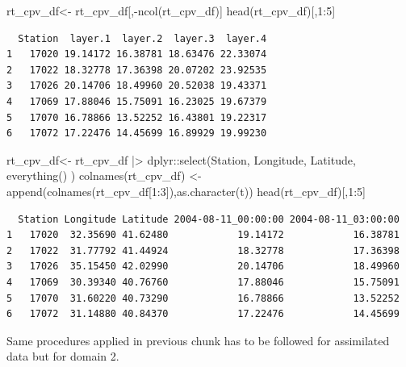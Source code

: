 \documentclass[
  letterpaper,
  DIV=11,
  numbers=noendperiod,
  abstract]{scrartcl}
\newenvironment{Shaded}{\begin{snugshade}}{\end{snugshade}}
\newcommand{\DecValTok}[1]{\textcolor[rgb]{0.68,0.00,0.00}{#1}}
\newcommand{\FunctionTok}[1]{\textcolor[rgb]{0.28,0.35,0.67}{#1}}
\newcommand{\NormalTok}[1]{\textcolor[rgb]{0.00,0.23,0.31}{#1}}
\newcommand{\OtherTok}[1]{\textcolor[rgb]{0.00,0.23,0.31}{#1}}
\newcommand{\SpecialCharTok}[1]{\textcolor[rgb]{0.37,0.37,0.37}{#1}}
\begin{document}
\begin{Shaded}
\begin{Highlighting}[]
\NormalTok{rt\_cpv\_df}\OtherTok{\textless{}{-}}\NormalTok{ rt\_cpv\_df[,}\SpecialCharTok{{-}}\FunctionTok{ncol}\NormalTok{(rt\_cpv\_df)]}
\FunctionTok{head}\NormalTok{(rt\_cpv\_df)[,}\DecValTok{1}\SpecialCharTok{:}\DecValTok{5}\NormalTok{]}
\end{Highlighting}
\end{Shaded}

\begin{verbatim}
  Station  layer.1  layer.2  layer.3  layer.4
1   17020 19.14172 16.38781 18.63476 22.33074
2   17022 18.32778 17.36398 20.07202 23.92535
3   17026 20.14706 18.49960 20.52038 19.43371
4   17069 17.88046 15.75091 16.23025 19.67379
5   17070 16.78866 13.52252 16.43801 19.22317
6   17072 17.22476 14.45699 16.89929 19.99230
\end{verbatim}

\begin{Shaded}
\begin{Highlighting}[]
\NormalTok{rt\_cpv\_df}\OtherTok{\textless{}{-}} 
\NormalTok{  rt\_cpv\_df }\SpecialCharTok{|\textgreater{}} 
\NormalTok{  dplyr}\SpecialCharTok{::}\FunctionTok{select}\NormalTok{(Station, Longitude, Latitude,  }\FunctionTok{everything}\NormalTok{() )}
\FunctionTok{colnames}\NormalTok{(rt\_cpv\_df) }\OtherTok{\textless{}{-}} \FunctionTok{append}\NormalTok{(}\FunctionTok{colnames}\NormalTok{(rt\_cpv\_df[}\DecValTok{1}\SpecialCharTok{:}\DecValTok{3}\NormalTok{]),}\FunctionTok{as.character}\NormalTok{(t))}
\FunctionTok{head}\NormalTok{(rt\_cpv\_df)[,}\DecValTok{1}\SpecialCharTok{:}\DecValTok{5}\NormalTok{]}
\end{Highlighting}
\end{Shaded}

\begin{verbatim}
  Station Longitude Latitude 2004-08-11_00:00:00 2004-08-11_03:00:00
1   17020  32.35690 41.62480            19.14172            16.38781
2   17022  31.77792 41.44924            18.32778            17.36398
3   17026  35.15450 42.02990            20.14706            18.49960
4   17069  30.39340 40.76760            17.88046            15.75091
5   17070  31.60220 40.73290            16.78866            13.52252
6   17072  31.14880 40.84370            17.22476            14.45699
\end{verbatim}

Same procedures applied in previous chunk has to be followed for
assimilated data but for domain 2.
\end{document}
